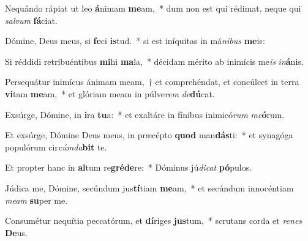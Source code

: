 \item Nequándo rápiat ut leo \textbf{á}nimam \textbf{me}am,~* dum non est qui rédimat, neque qui \textit{sal}\textit{vum} \textbf{fá}ciat.
\item Dómine, Deus meus, si \textbf{fe}ci \textbf{is}tud.~* si est iníquitas in má\textit{ni}\textit{bus} \textbf{me}is:
\item Si réddidi retribuéntibus \textbf{mi}hi \textbf{ma}la,~* décidam mérito ab inimícis me\textit{is} \textit{in}\textbf{á}nis.
\item Persequátur inimícus ánimam meam,~† et comprehéndat, et concúlcet in terra \textbf{vi}tam \textbf{me}am,~* et glóriam meam in púlve\textit{rem} \textit{de}\textbf{dú}cat.
\item Exsúrge, Dómine, in \textbf{i}ra \textbf{tu}a:~* et exaltáre in fínibus inimicó\textit{rum} \textit{me}\textbf{ó}rum.
\item Et exsúrge, Dómine Deus meus, in præcépto \textbf{quod} man\textbf{dás}ti:~* et synagóga populórum cir\textit{cúm}\textit{da}\textbf{bit} te.
\item Et propter hanc in \textbf{al}tum re\textbf{gré}\textbf{de}re:~* Dóminus jú\textit{di}\textit{cat} \textbf{pó}pulos.
\item Júdica me, Dómine, secúndum jus\textbf{tí}tiam \textbf{me}am,~* et secúndum innocéntiam \textit{me}\textit{am} \textbf{su}per me.
\item Consumétur nequítia peccatórum, et \textbf{dí}riges \textbf{jus}tum,~* scrutans corda et \textit{re}\textit{nes} \textbf{De}us.
